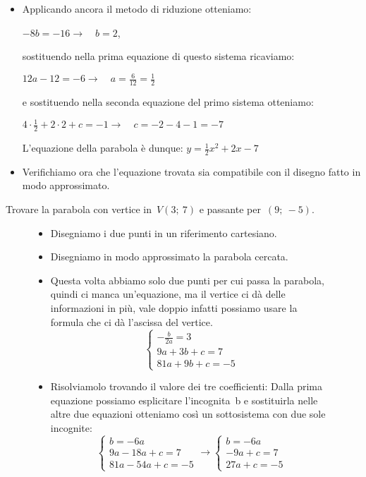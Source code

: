 \begin{exrig}
\begin{esempio}
 \begin{itemize}
  \item Applicando ancora il metodo di riduzione otteniamo: 

$-8b=-16 \rightarrow \quad b=2$, 

sostituendo nella prima equazione di questo sistema ricaviamo:

$12a-12=-6 \rightarrow \quad a=\frac{6}{12}=\frac{1}{2}$

e sostituendo nella seconda equazione del primo sistema otteniamo:

$4 \cdot \frac{1}{2} +2 \cdot 2 +c=-1 \rightarrow \quad c=-2-4-1=-7$

L'equazione della parabola è dunque: $y=\frac{1}{2}x^2+2x-7$

  \item Verifichiamo ora che l'equazione trovata sia compatibile con il disegno 
  fatto in modo approssimato.
 \end{itemize}
\end{esempio}

\begin{esempio}
 Trovare la parabola con vertice in~$V(3;~7)$ e passante per~$(9;~-5)$.
 
\begin{figure}[h]
\begin{minipage}{.60\textwidth}
 \begin{itemize}
  \item Disegniamo i due punti in un riferimento cartesiano.
  \item Disegniamo in modo approssimato la parabola cercata.
  \item Questa volta abbiamo solo due punti per cui passa la parabola, quindi
   ci manca un'equazione, ma il vertice ci dà delle informazioni in più, 
   vale doppio infatti possiamo usare la formula che ci dà l'ascissa del 
   vertice.
\[\left\{\begin{array}{l}
  -\frac{b}{2a}=3\\
  9a+3b+c=7\\
  81a+9b+c=-5
\end{array}\right. \]
  \item Risolviamolo trovando il valore dei tre coefficienti:
   Dalla prima equazione possiamo esplicitare l'incognita~b e sostituirla
   nelle altre due equazioni otteniamo così un sottosistema con due sole 
   incognite:
\[\left\{\begin{array}{l}
  b=-6a \\
  9a-18a+c=7\\
  81a-54a+c=-5
\end{array}\right. \rightarrow 
\left\{\begin{array}{l}
  b=-6a \\
  -9a+c=7\\
  27a+c=-5
\end{array}\right.\]
 \end{itemize}


\end{minipage}
\end{figure}
\end{esempio}
\end{exrig}
